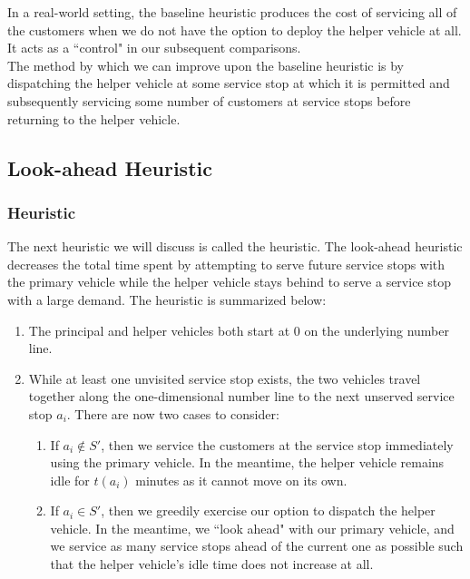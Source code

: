 \documentclass[12pt]{scrartcl}
\begin{document}
In a real-world setting, the baseline heuristic produces the cost of servicing all of the customers when we do not have the option to deploy the helper vehicle at all. It acts as a ``control" in our subsequent comparisons.  \\

The method by which we can improve upon the baseline heuristic is by dispatching the helper vehicle at some service stop at which it is permitted and subsequently servicing some number of customers at service stops before returning to the helper vehicle. 

\subsection{Look-ahead Heuristic}
\subsubsection{Heuristic}
The next heuristic we will discuss is called the  heuristic. The look-ahead heuristic decreases the total time spent by attempting to serve future service stops with the primary vehicle while the helper vehicle stays behind to serve a service stop with a large demand. The heuristic is summarized below:

\begin{enumerate}
    \item The principal and helper vehicles both start at $0$ on the underlying number line. 
    \item While at least one unvisited service stop exists, the two vehicles travel together along the one-dimensional number line to the next unserved service stop $a_i$. There are now two cases to consider: 
    \begin{enumerate}
        \item If $a_i \not \in S'$, then we service the customers at the service stop immediately using the primary vehicle. In the meantime, the helper vehicle remains idle for $t(a_i)$ minutes as it cannot move on its own. 
        \item If $a_i \in S'$, then we greedily exercise our option to dispatch the helper vehicle. In the meantime, we ``look ahead" with our primary vehicle, and we service as many service stops ahead of the current one as possible such that the helper vehicle's idle time does not increase at all. 
    \end{enumerate}
\end{enumerate}
\end{document}
